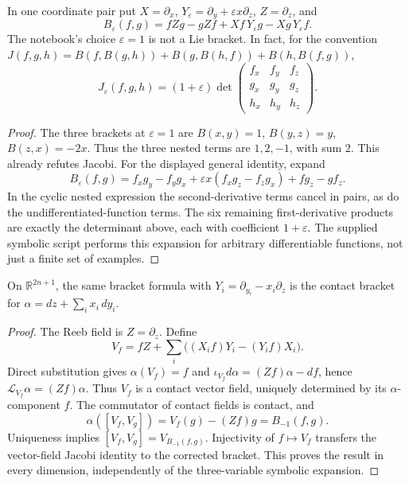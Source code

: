 \begin{proposition}\oursComputed{}
In one coordinate pair put \(X=\partial_x\), \(Y_\varepsilon=\partial_y+\varepsilon x\partial_z\), \(Z=\partial_z\), and
\[
 B_\varepsilon(f,g)=fZg-gZf+Xf\,Y_\varepsilon g-Xg\,Y_\varepsilon f.
\]
The notebook's choice \(\varepsilon=1\) is not a Lie bracket. In fact, for the convention
\(J(f,g,h)=B(f,B(g,h))+B(g,B(h,f))+B(h,B(f,g))\),
\[
 J_\varepsilon(f,g,h)=(1+\varepsilon)
 \det\begin{pmatrix}f_x&f_y&f_z\\g_x&g_y&g_z\\h_x&h_y&h_z\end{pmatrix}.
\]
\end{proposition}
\begin{proof}
The three brackets at \(\varepsilon=1\) are
\(B(x,y)=1\), \(B(y,z)=y\), \(B(z,x)=-2x\). Thus the three nested terms are \(1,2,-1\), with sum \(2\). This already refutes Jacobi. For the displayed general identity, expand
\[
 B_\varepsilon(f,g)=f_xg_y-f_yg_x+
 \varepsilon x(f_xg_z-f_zg_x)+fg_z-gf_z.
\]
In the cyclic nested expression the second-derivative terms cancel in pairs, as do the undifferentiated-function terms. The six remaining first-derivative products are exactly the determinant above, each with coefficient \(1+\varepsilon\). The supplied symbolic script performs this expansion for arbitrary differentiable functions, not just a finite set of examples.
\end{proof}

\begin{proposition}\ours{}
On \(\mathbb R^{2n+1}\), the same bracket formula with
\(Y_i=\partial_{y_i}-x_i\partial_z\) is the contact bracket for
\(\alpha=dz+\sum_i x_i\,dy_i\).
\end{proposition}
\begin{proof}
The Reeb field is \(Z=\partial_z\). Define
\[
 V_f=fZ+\sum_i\bigl((X_if)Y_i-(Y_if)X_i\bigr).
\]
Direct substitution gives \(\alpha(V_f)=f\) and
\(\iota_{V_f}d\alpha=(Zf)\alpha-df\), hence
\(\mathcal L_{V_f}\alpha=(Zf)\alpha\). Thus \(V_f\) is a contact vector field, uniquely determined by its \(\alpha\)-component \(f\). The commutator of contact fields is contact, and
\[
 \alpha([V_f,V_g])=V_f(g)-(Zf)g=B_{-1}(f,g).
\]
Uniqueness implies \([V_f,V_g]=V_{B_{-1}(f,g)}\). Injectivity of \(f\mapsto V_f\) transfers the vector-field Jacobi identity to the corrected bracket. This proves the result in every dimension, independently of the three-variable symbolic expansion.
\end{proof}


